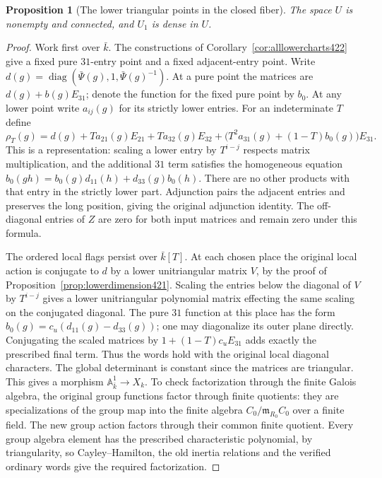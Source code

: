 \documentclass[a4paper,11pt]{article}
\newtheorem{proposition}{Proposition}[section]
\theoremstyle{definition}
\theoremstyle{remark}
\numberwithin{equation}{section}
\begin{document}
\begin{proposition}[The lower triangular points in the closed fiber]\leavevmode
\label{prop:lowercore423}
The space \(U\) is nonempty and connected, and \(U_1\) is
dense in \(U\).
\end{proposition}
\begin{proof}
Work first over \(\bar k\). The constructions of
Corollary~\ref{cor:alllowercharts422} give a fixed pure
\(31\)-entry point and a fixed adjacent-entry point. Write
\(d(g)=\operatorname{diag}(\bar\Psi(g),1,\bar\Psi(g)^{-1})\).
At a pure point the matrices are \(d(g)+b(g)E_{31}\);
denote the function for the fixed pure point by \(b_0\).
At any lower point write \(a_{ij}(g)\) for its strictly lower
entries. For an indeterminate \(T\) define
\[
 \rho_T(g)=d(g)+T a_{21}(g)E_{21}+T a_{32}(g)E_{32}
               +\bigl(T^2a_{31}(g)+(1-T)b_0(g)\bigr)E_{31}.
\]
This is a representation: scaling a lower entry by
\(T^{i-j}\) respects matrix multiplication, and the additional
\(31\) term satisfies the homogeneous equation
\(b_0(gh)=b_0(g)d_{11}(h)+d_{33}(g)b_0(h)\). There are no
other products with that entry in the strictly lower part.
Adjunction pairs the adjacent entries and preserves the long
position, giving the original adjunction identity. The
off-diagonal entries of \(Z\) are zero for both input matrices
and remain zero under this formula.

The ordered local flags persist over \(\bar k[T]\). At each
chosen place the original local action is conjugate to \(d\)
by a lower unitriangular matrix \(V\), by the proof of
Proposition~\ref{prop:lowerdimension421}. Scaling the entries
below the diagonal of \(V\) by \(T^{i-j}\) gives a lower
unitriangular polynomial matrix effecting the same scaling
on the conjugated diagonal. The pure \(31\) function at this
place has the form \(b_0(g)=c_u(d_{11}(g)-d_{33}(g))\);
one may diagonalize its outer plane directly. Conjugating
the scaled matrices by \(1+(1-T)c_uE_{31}\) adds exactly the
prescribed final term. Thus the words hold with the original
local diagonal characters. The global determinant is constant
since the matrices are triangular. This gives a morphism
\(\mathbb A^1_{\bar k}\to X_k\). To check factorization through
the finite Galois algebra, the original group functions factor
through finite quotients: they are specializations of the
group map into the finite algebra \(C_0/\mathfrak m_{R_0}C_0\)
over a finite field. The new group action factors through their
common finite quotient. Every group algebra element has the
prescribed characteristic polynomial, by triangularity, so
Cayley--Hamilton, the old inertia relations and the verified
ordinary words give the required factorization.


\end{proof}
\end{document}

